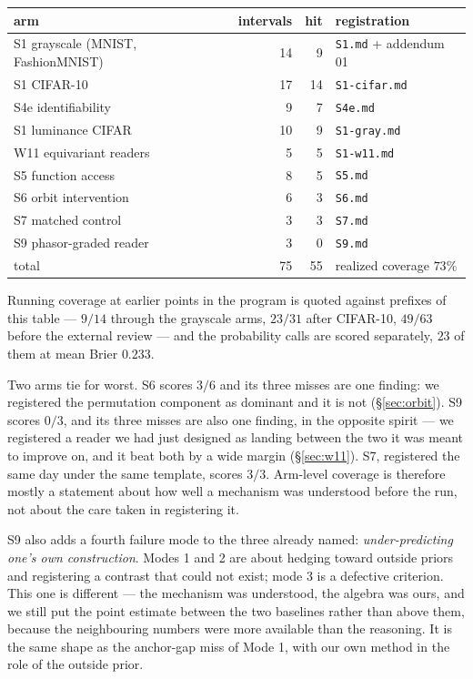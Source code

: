 \documentclass[10pt,letterpaper]{article}
\theoremstyle{definition}
\begin{document}
\begin{center}\small
\begin{tabular}{@{}lrrl@{}}
\toprule
arm & intervals & hit & registration \\
\midrule
S1 grayscale (MNIST, FashionMNIST) & 14 & 9 & \texttt{S1.md} + addendum 01 \\
S1 CIFAR-10                        & 17 & 14 & \texttt{S1-cifar.md} \\
S4e identifiability                & 9  & 7  & \texttt{S4e.md} \\
S1 luminance CIFAR                 & 10 & 9  & \texttt{S1-gray.md} \\
W11 equivariant readers            & 5  & 5  & \texttt{S1-w11.md} \\
S5 function access                 & 8  & 5  & \texttt{S5.md} \\
S6 orbit intervention              & 6  & 3  & \texttt{S6.md} \\
S7 matched control                 & 3  & 3  & \texttt{S7.md} \\
S9 phasor-graded reader            & 3  & 0  & \texttt{S9.md} \\
\midrule
total                              & 75 & 55 & realized coverage $73\%$ \\
\bottomrule
\end{tabular}
\end{center}

Running coverage at earlier points in the program is quoted against prefixes of this table ---
$9/14$ through the grayscale arms, $23/31$ after CIFAR-10, $49/63$ before the external review --- and
the probability calls are scored separately, $23$ of them at mean Brier $0.233$.

Two arms tie for worst. S6 scores $3/6$ and its three misses are one finding: we registered the
permutation component as dominant and it is not (\S\ref{sec:orbit}). S9 scores $0/3$, and its three
misses are also one finding, in the opposite spirit --- we registered a reader we had just designed
as landing between the two it was meant to improve on, and it beat both by a wide margin
(\S\ref{sec:w11}). S7, registered the same day under the same template, scores $3/3$. Arm-level
coverage is therefore mostly a statement about how well a mechanism was understood before the run,
not about the care taken in registering it.

S9 also adds a fourth failure mode to the three already named: \emph{under-predicting one's own
construction}. Modes 1 and 2 are about hedging toward outside priors and registering a contrast that
could not exist; mode 3 is a defective criterion. This one is different --- the mechanism was
understood, the algebra was ours, and we still put the point estimate between the two baselines
rather than above them, because the neighbouring numbers were more available than the reasoning. It
is the same shape as the anchor-gap miss of Mode 1, with our own method in the role of the outside
prior.
\end{document}
